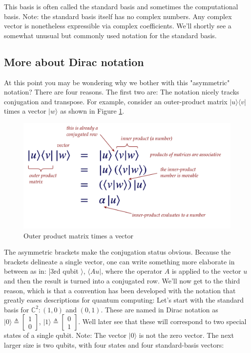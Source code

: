 \documentclass[main.tex]{subfiles}
\begin{document}
    This basis is often called the standard basis and sometimes the computational basis. Note: the standard basis itself has no complex numbers. Any complex vector is nonetheless expressible via complex coefficients. We'll shortly see a somewhat unusual but commonly used notation for the standard basis.
    
\subsection{More about Dirac notation}
    
    At this point you may be wondering why we bother with this "asymmetric" notation? There are four reasons. The first two are: The notation nicely tracks conjugation and transpose. For example, consider an outer-product matrix $|u\rangle\langle v|$ times a vector $|w\rangle$ as shown in Figure \ref{fig:08dirac4}.
    
    \begin{figure}
        \centering
        \includegraphics[width=5in]{notes/figs/n04/08dirac4.png}
        \caption{Outer product matrix times a vector}
        \label{fig:08dirac4}
    \end{figure}
    
    The asymmetric brackets make the conjugation status obvious. Because the brackets delineate a single vector, one can write something more elaborate in between as in: |3rd qubit $\rangle$, $\langle A u|$, where the operator $A$ is applied to the vector $u$ and then the result is turned into a conjugated row. We'll now get to the third reason, which is that a convention has been developed with the notation that greatly eases descriptions for quantum computing: Let's start with the standard basis for $\mathbb{C}^{2}:(1,0)$ and $(0,1)$. These are named in Dirac notation as $|0\rangle \triangleq\left[\begin{array}{l}1 \\ 0\end{array}\right]$, $|1\rangle \triangleq\left[\begin{array}{l}0 \\ 1\end{array}\right]$. Well later see that these will correspond to two special states of a single qubit. Note: The vector $|0\rangle$ is not the zero vector. The next larger size is two qubits, with four states and four standard-basis vectors: 
    
\end{document}
